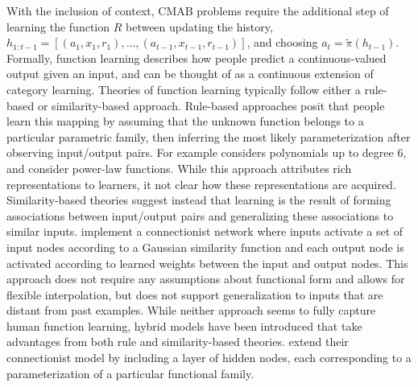 \documentclass[10pt,letterpaper]{article}
\begin{document}
	With the inclusion of context, CMAB problems require the additional step of learning the function $R$ between updating the history, $h_{1:t-1} = [(a_{1}, x_{1}, r_{1}),...,(a_{t-1}, x_{t-1}, r_{t-1})]$, and choosing $a_{t} = \tilde{\pi}(h_{t-1})$. Formally, function learning describes how people predict a continuous-valued output given an input, and can be thought of as a continuous extension of category learning. Theories of function learning typically follow either a rule-based or similarity-based approach. Rule-based approaches posit that people learn this mapping by assuming that the unknown function belongs to a particular parametric family, then inferring the most likely parameterization after observing input/output pairs. For example \cite{Carroll} considers polynomials up to degree 6, and \cite{Koh} consider power-law functions. While this approach attributes rich representations to learners, it not clear how these representations are acquired. Similarity-based theories suggest instead that learning is the result of forming associations between input/output pairs and generalizing these associations to similar inputs. \cite{Busemeyer2005LearningFR} implement a connectionist network where inputs activate a set of input nodes according to a Gaussian similarity function and each output node is activated according to learned weights between the input and output nodes. This approach does not require any assumptions about functional form and allows for flexible interpolation, but does not support generalization to inputs that are distant from past examples. While neither approach seems to fully capture human function learning, hybrid models have been introduced that take advantages from both rule and similarity-based theories. \cite{McDaniel2005TheCB} extend their connectionist model by including a layer of hidden nodes, each corresponding to a parameterization of a particular functional family. 
	
\end{document}
